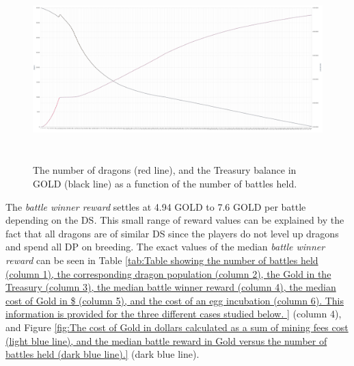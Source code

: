 \documentclass[12pt]{article}
\begin{document}
{\begin{figure}[H]
	\begin{Center}
		\includegraphics[width=6.27in,height=2.79in]{./media/CS1image1.png}
		\caption{The number of dragons (red line), and the Treasury balance in GOLD (black line)  as a function of the number of battles held.}
		\label{fig:The number of dragons (red line) as a function of the number of battles held, and the Treasury balance in GOLD (black line)}
	\end{Center}
\end{figure}




The \textit{battle winner reward} settles at 4.94 GOLD to 7.6 GOLD per battle depending on the DS\textit{.} This small range of reward values can be explained by the fact that all dragons are of similar DS since the players do not level up dragons and spend all DP on breeding. The exact values of the median \textit{battle winner reward }can be seen in  Table \ref{tab:Table showing the number of battles held (column 1), the corresponding dragon population (column 2), the Gold in the Treasury (column 3), the median battle winner reward (column 4), the median cost of Gold in $ (column 5), and the cost of an egg incubation (column 6).  This information is provided for the three different cases studied below. } (column 4), and Figure \ref{fig:The cost of Gold in dollars calculated as a sum of mining fees cost (light blue line), and the median battle reward in Gold versus the number of battles held (dark blue line).} (dark blue line).\par




}
\end{document}

